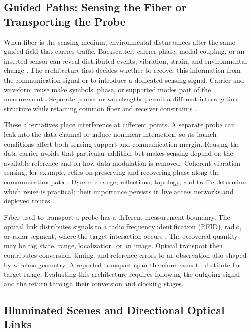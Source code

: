 \subsection{Guided Paths: Sensing the Fiber or Transporting the Probe}

When fiber is the sensing medium, environmental disturbances alter the same
guided field that carries traffic. Backscatter, carrier phase, modal coupling,
or an inserted sensor can reveal distributed events, vibration, strain, and
environmental change
\cite{OISAC_SCR00957,OISAC_SCR00432,OISAC_SCR00356,OISAC_SCR00679}.
The architecture first decides whether to recover this information from the
communication signal or to introduce a dedicated sensing signal. Carrier and
waveform reuse make symbols, phase, or supported modes part of the measurement
\cite{OISAC_SCR00647,OISAC_SCR00038,OISAC_SCR00015}. Separate probes or
wavelengths permit a different interrogation structure while retaining common
fiber and receiver constraints
\cite{OISAC_SCR00013,OISAC_SCR00344,OISAC_SCR00218}.

These alternatives place interference at different points. A separate probe
can leak into the data channel or induce nonlinear interaction, so its launch
conditions affect both sensing support and communication margin. Reusing the
data carrier avoids that particular addition but makes sensing depend on the
available reference and on how data modulation is removed. Coherent vibration
sensing, for example, relies on preserving and recovering phase along the
communication path \cite{OISAC_SCR00647}. Dynamic range, reflections, topology,
and traffic determine which reuse is practical; their importance persists in
live access networks and deployed routes \cite{OISAC_SCR00218,OISAC_SCR00957}.

Fiber used to transport a probe has a different measurement boundary. The
optical link distributes signals to a radio frequency identification (RFID),
radio, or radar segment, where the
target interaction occurs
\cite{OISAC_SCR00496,OISAC_SCR00631,OISAC_SCR00719,OISAC_SCR00983,OISAC_SCR01049}.
The recovered quantity may be tag state, range, localization, or an image.
Optical transport then contributes conversion, timing, and reference errors to
an observation also shaped by wireless geometry. A reported transport span
therefore cannot substitute for target range. Evaluating this architecture
requires following the outgoing signal and the return through their conversion
and clocking stages.

\subsection{Illuminated Scenes and Directional Optical Links}

